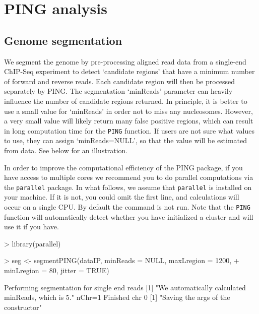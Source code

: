 \documentclass[11pt]{article}
\begin{document}


\section{PING analysis}

\subsection{Genome segmentation}
We segment the genome by pre-processing aligned read data from a single-end ChIP-Seq experiment to detect `candidate regions' that have a minimum number of forward and reverse reads. Each candidate region will then be processed separately by PING. The segmentation `minReads' parameter can heavily influence the number of candidate regions returned. In principle, it is better to use a small value for `minReads' in order not to miss any nucleosomes. However, a very small value will likely return many false positive regions, which can result in long computation time for the \texttt{PING} function. If users are not sure what values to use, they can assign `minReads=NULL', so that the value will be estimated from data. See below for an illustration.

In order to improve the computational efficiency of the PING package, if you have access to multiple cores we recommend you to do parallel computations via the \texttt{parallel} package. In what follows, we assume that \texttt{parallel} is installed on your machine. If it is not, you could omit the first line, and calculations will occur on a single CPU.
By default the command is not run. Note that the \texttt{PING} function will automatically detect whether you have initialized a
cluster and will use it if you have.

\begin{Schunk}
\begin{Sinput}
> library(parallel)
\end{Sinput}
\end{Schunk}


\begin{Schunk}
\begin{Sinput}
> seg <- segmentPING(dataIP, minReads = NULL, maxLregion = 1200, 
+     minLregion = 80, jitter = TRUE)
\end{Sinput}
\begin{Soutput}
Performing segmentation for single end reads
[1] "We automatically calculated minReads, which is 5."
nChr=1
Finished chr 0 
[1] "Saving the args of the constructor"
\end{Soutput}
\end{Schunk}
\end{document}
